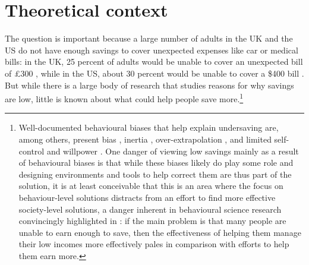 
\section{Theoretical context}%
\label{sec:theoretical_context}



The question is important because a large number of adults in the UK and the US
do not have enough savings to cover unexpected expenses like car or medical
bills: in the UK, 25 percent of adults would be unable to cover an unexpected
bill of \pounds300 \citep{philipps2021supporting}, while in the US, about 30
percent would be unable to cover a \$400 bill \citep{fed2022economic}. But
while there is a large body of research that studies reasons for why savings
are low, little is known about what could help people save
more.\footnote{Well-documented behavioural biases that help explain undersaving
    are, among others, present bias \citep{laibson1997golden,
    laibson2019intertemporal}, inertia \citep{madrian2001power},
    over-extrapolation \citep{choi2009reinforcement}, and limited self-control
    and willpower \citep{thaler1981economic, benhabib2005modeling,
    fudenberg2006dual, loewenstein2004animal, gul2001temptation}. One danger of
    viewing low savings mainly as a result of behavioural biases is that while
    these biases likely do play some role and designing environments and tools
    to help correct them are thus part of the solution, it is at least
    conceivable that this is an area where the focus on behaviour-level
    solutions distracts from an effort to find more effective society-level
    solutions, a danger inherent in behavioural science research convincingly
    highlighted in \citet{chater2022frame}: if the main problem is that many
people are unable to earn enough to save, then the effectiveness of helping
them manage their low incomes more effectively pales in comparison with efforts
to help them earn more.}

